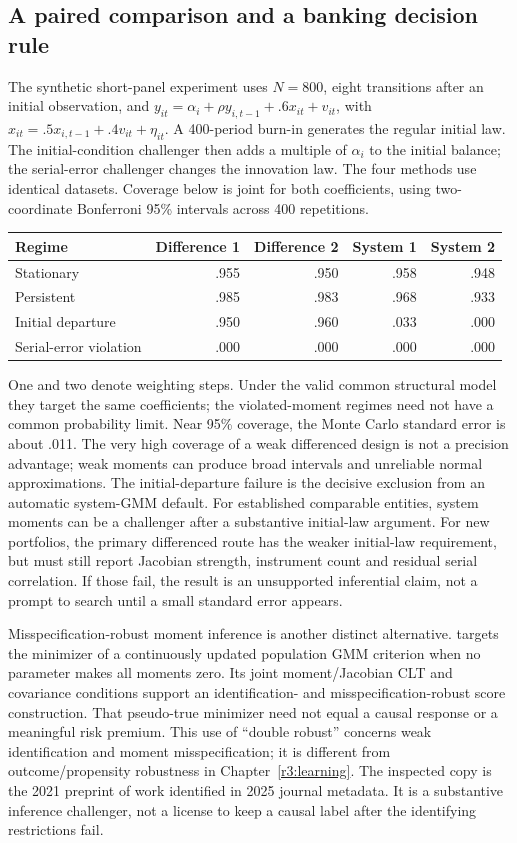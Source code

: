 \subsection{A paired comparison and a banking decision rule}
The synthetic short-panel experiment uses $N=800$, eight transitions after
an initial observation, and
$y_{it}=\alpha_i+\rho y_{i,t-1}+.6x_{it}+v_{it}$, with
$x_{it}=.5x_{i,t-1}+.4v_{it}+\eta_{it}$. A 400-period burn-in generates
the regular initial law. The initial-condition challenger then adds a
multiple of $\alpha_i$ to the initial balance; the serial-error challenger
changes the innovation law. The four methods use identical datasets.
Coverage below is joint for both coefficients, using two-coordinate
Bonferroni 95\% intervals across 400 repetitions.
\begin{center}\small
\begin{tabular}{lrrrr}\toprule
Regime & Difference 1 & Difference 2 & System 1 & System 2\\\midrule
Stationary & .955 & .950 & .958 & .948\\
Persistent & .985 & .983 & .968 & .933\\
Initial departure & .950 & .960 & .033 & .000\\
Serial-error violation & .000 & .000 & .000 & .000\\\bottomrule
\end{tabular}\end{center}
One and two denote weighting steps. Under the valid common structural model
they target the same coefficients; the violated-moment regimes need not have
a common probability limit. Near
95\% coverage, the Monte Carlo standard error is about .011. The very high
coverage of a weak differenced design is not a precision advantage; weak
moments can produce broad intervals and unreliable normal approximations.
The initial-departure failure is the decisive exclusion from an automatic
system-GMM default. For established comparable entities, system moments can
be a challenger after a substantive initial-law argument. For new portfolios,
the primary differenced route has the weaker initial-law requirement, but
must still report Jacobian strength, instrument count and residual serial
correlation. If those fail, the result is an unsupported inferential claim,
not a prompt to search until a small standard error appears.

Misspecification-robust moment inference is another distinct alternative.
\citet[Sections 2--3, Assumptions 1--2]{kleibergen2021} targets the minimizer
of a continuously updated population GMM criterion when no parameter makes
all moments zero. Its joint moment/Jacobian CLT and covariance conditions
support an identification- and misspecification-robust score construction.
That pseudo-true minimizer need not equal a causal response or a meaningful
risk premium. This use of ``double robust'' concerns weak identification and
moment misspecification; it is different from outcome/propensity robustness
in Chapter~\ref{r3:learning}. The inspected copy is the 2021 preprint of work
identified in 2025 journal metadata. It is a substantive inference challenger,
not a license to keep a causal label after the identifying restrictions fail.
